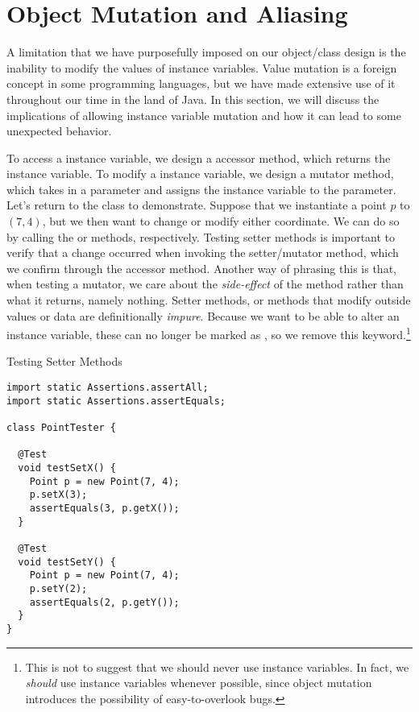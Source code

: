 \section{Object Mutation and Aliasing}
\label{sec:object-mutation-and-aliasing}
A limitation that we have purposefully imposed on our object/class design is the inability to modify the values of instance variables. Value mutation is a foreign concept in some programming languages, but we have made extensive use of it throughout our time in the land of Java. In this section, we will discuss the implications of allowing instance variable mutation and how it can lead to some unexpected behavior.

To access a  instance variable, we design a  accessor method, which returns the instance variable. To modify a  instance variable, we design a  mutator method, which takes in a parameter and assigns the instance variable to the parameter. Let's return to the  class to demonstrate. Suppose that we instantiate a point $p$ to $(7, 4)$, but we then want to change or modify either coordinate. We can do so by calling the  or  methods, respectively. Testing setter methods is important to verify that a change occurred when invoking the setter/mutator method, which we confirm through the accessor method. Another way of phrasing this is that, when testing a mutator, we care about the \emph{side-effect} of the method rather than what it returns, namely nothing. Setter methods, or methods that modify outside values or data are definitionally \emph{impure}. Because we want to be able to alter an instance variable, these can no longer be marked as , so we remove this keyword.\footnote{This is not to suggest that we should never use  instance variables. In fact, we \emph{should} use  instance variables whenever possible, since object mutation introduces the possibility of easy-to-overlook bugs.}

\begin{cl}[]{Testing  Setter Methods}
\begin{lstlisting}[language=MyJava]
import static Assertions.assertAll;
import static Assertions.assertEquals;

class PointTester {

  @Test
  void testSetX() {
    Point p = new Point(7, 4);
    p.setX(3);
    assertEquals(3, p.getX());
  }

  @Test
  void testSetY() {
    Point p = new Point(7, 4);
    p.setY(2);
    assertEquals(2, p.getY());
  }
}
\end{lstlisting}
\end{cl}

